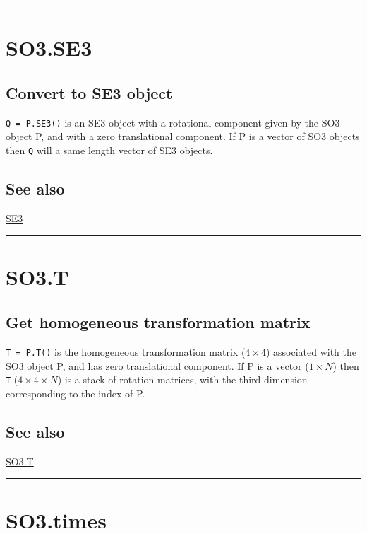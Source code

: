 \vspace{1.5ex}\hrule

\hypertarget{SO3.SE3}{\section*{SO3.SE3}}
\subsection*{Convert to SE3 object}


\texttt{Q = P.SE3()} is an SE3 object with a rotational component given by the
SO3 object P, and with a zero translational component.  If P is a vector
of SO3 objects then \texttt{Q} will a same length vector of SE3 objects.


\subsection*{See also}


\hyperlink{SE3}{\color{blue} SE3}

\vspace{1.5ex}\hrule

\hypertarget{SO3.T}{\section*{SO3.T}}
\subsection*{Get homogeneous transformation matrix}


\texttt{T = P.T()} is the homogeneous transformation matrix ($4 \times 4$) associated with the
SO3 object P, and has zero translational component.  If P is a vector
($1 \times N$) then \texttt{T} ($4 \times 4 \times N$) is a stack of rotation matrices, with the third
dimension corresponding to the index of P.


\subsection*{See also}


\hyperlink{SO3.T}{\color{blue} SO3.T}

\vspace{1.5ex}\hrule

\hypertarget{SO3.times}{\section*{SO3.times}}
